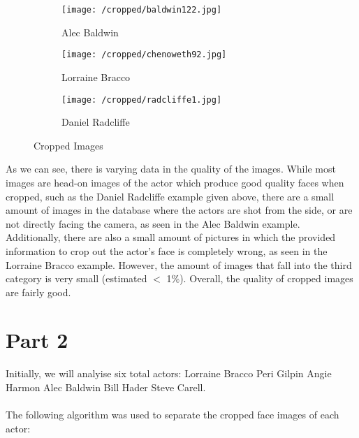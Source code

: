 \documentclass[11pt,a4paper]{report}
\begin{document}
\begin{figure}[h]
\centering
\begin{subfigure}{.3\textwidth}
  \centering
  \texttt{[image: /cropped/baldwin122.jpg]}
  \caption{Alec Baldwin}
  \label{fig:sub1}
\end{subfigure}%
\begin{subfigure}{.3\textwidth}
  \centering
  \texttt{[image: /cropped/chenoweth92.jpg]}
  \caption{Lorraine Bracco}
  \label{fig:sub2}
\end{subfigure}
\begin{subfigure}{.3\textwidth}
  \centering
  \texttt{[image: /cropped/radcliffe1.jpg]}
  \caption{Daniel Radcliffe}
  \label{fig:sub2}
\end{subfigure}
\caption{Cropped Images}
\label{fig:test}
\end{figure}	

As we can see, there is varying data in the quality of the images. While most images are head-on images of the actor which produce good quality faces when cropped, such as the Daniel Radcliffe example given above, there are a small amount of images in the database where the actors are shot from the side, or are not directly facing the camera, as seen in the Alec Baldwin example. Additionally, there are also a small amount of pictures in which the provided information to crop out the actor's face is completely wrong, as seen in the Lorraine Bracco example. However, the amount of images that fall into the third category is very small (estimated $<$ 1\%). Overall, the quality of cropped images are fairly good.

\section*{Part 2}
Initially, we will analyise six total actors: Lorraine Bracco Peri Gilpin Angie Harmon Alec Baldwin Bill Hader Steve Carell. \\\\
The following algorithm was used to separate the cropped face images of each actor: 
\end{document}
